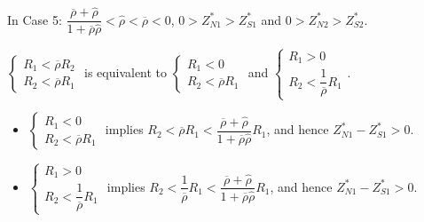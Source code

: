 \documentclass[10pt]{article}
\begin{document}
In Case 5: $ \dfrac{\overline{\rho} + {\hat \rho}}{1 + \overline{\rho} {\hat \rho}} < {\hat \rho} < \overline{\rho} < 0 $, $ 0 > Z_{N 1}^* > Z_{S 1}^* $ and $ 0 > Z_{N 2}^* > Z_{S 2}^* $.

$ \left\{ \begin{matrix} R_1 < \overline{\rho} R_2 \\ R_2 < \overline{\rho} R_1 \end{matrix} \right. $ is equivalent to $ \left\{ \begin{matrix} R_1 < 0 \\ R_2 < \overline{\rho} R_1 \end{matrix} \right. $ and $ \left\{ \begin{matrix} R_1 > 0 \\ R_2 < \dfrac{1}{\overline{\rho}} R_1 \end{matrix} \right. $. 
\begin{itemize}
\item $ \left\{ \begin{matrix} R_1 < 0 \\ R_2 < \overline{\rho} R_1 \end{matrix} \right. $ implies $ R_2 < \overline{\rho} R_1 < \dfrac{\overline{\rho} + {\hat \rho}}{1 + \overline{\rho} {\hat \rho}} R_1 $, and hence $ Z_{N 1}^* - Z_{S 1}^* > 0 $.
\item $ \left\{ \begin{matrix} R_1 > 0 \\ R_2 < \dfrac{1}{\overline{\rho}} R_1 \end{matrix} \right. $ implies $ R_2 < \dfrac{1}{\overline{\rho}} R_1 < \dfrac{\overline{\rho} + {\hat \rho}}{1 + \overline{\rho} {\hat \rho}} R_1 $, and hence $ Z_{N 1}^* - Z_{S 1}^* > 0 $.
\end{itemize}
\end{document}

